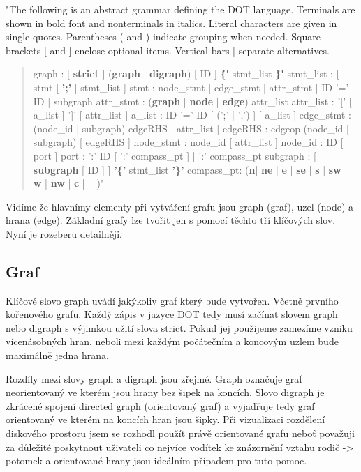 \documentclass[color,table,oneside,nolot,nolof]{fithesis}
\begin{document}
	"The following is an abstract grammar defining the DOT language. Terminals are shown in bold font and nonterminals in italics. Literal characters are given in single quotes. Parentheses
	( and ) indicate grouping when needed. Square brackets [ and ] enclose optional items. Vertical bars | separate alternatives.
	\begin{quotation}
	graph			:		[ \textbf{strict} ] (\textbf{graph} | \textbf{digraph}) [ ID ] \textbf{\'\{\'} stmt_list \textbf{\'\}\'}
	stmt_list :		[ stmt [ \textbf{';'} ] stmt_list ]
	stmt			:		node_stmt
	|							edge_stmt
	|							attr_stmt
	|							ID '=' ID
	|							subgraph
	attr_stmt	:	(\textbf{graph} | \textbf{node} | \textbf{edge}) attr_list
	attr_list	:	'[' [ a_list ] ']' [ attr_list ]
	a_list  	:	ID '=' ID [ (';' | ',') ] [ a_list ]
	edge_stmt	:	(node_id | subgraph) edgeRHS [ attr_list ]
	edgeRHS		:	edgeop (node_id | subgraph) [ edgeRHS ]
	node_stmt	:	node_id [ attr_list ]
	node_id		:	ID [ port ]
	port			:	':' ID [ ':' compass_pt ]
	|						':' compass_pt
	subgraph	:	[ \textbf{subgraph} [ ID ] ] \textbf{'\{'} stmt_list \textbf{'\}'}
	compass_pt:	(\textbf{n}| \textbf{ne} | \textbf{e} | \textbf{se} | \textbf{s} | \textbf{sw} | \textbf{w}  | \textbf{nw} | \textbf{c} | \textbf{_})"
	\end{quotation}

	Vidíme že hlavnímy elementy při vytváření grafu jsou graph (graf), uzel (node) a hrana (edge). Základní grafy lze tvořit jen s pomocí těchto tří klíčových slov. Nyní je rozeberu detailněji.

\subsection{Graf}
	Klíčové slovo graph uvádí jakýkoliv graf který bude vytvořen. Včetně prvního kořenového grafu. Každý zápis v jazyce DOT tedy musí začínat slovem graph nebo digraph s výjimkou užití slova
	strict. Pokud jej použijeme zamezíme vzniku vícenásobných hran, neboli mezi každým počátečním a koncovým uzlem bude maximálně jedna hrana. 

	Rozdíly mezi slovy graph a digraph jsou zřejmé. Graph označuje graf neorientovaný ve kterém jsou hrany bez šipek na koncích. Slovo digraph je zkrácené spojení directed graph (orientovaný
	graf) a vyjadřuje tedy graf orientovaný ve kterém na koncích hran jsou šipky. Při vizualizaci rozdělení diskového prostoru jsem se rozhodl použít právě orientované grafu neboť považuji za 
	důležité poskytnout uživateli co nejvíce vodítek ke znázornění vztahu rodič -> potomek a orientované hrany jsou ideálním případem pro tuto pomoc. 
\end{document}
